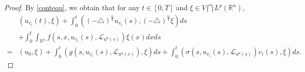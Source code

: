 \documentclass[11pt]{article}
\numberwithin{equation}{section}
\theoremstyle{plain}
\begin{document}
\begin{proof}
    By \eqref{contequ}, we obtain that for any
    $t\in [0,T]$ and
    $\xi \in  V \bigcap L^p(\mathbb{R}^n)$,
    \begin{align} \label{sc-12}
        & \left( u_{v_i} (t), \xi \right)
        + \int_0^t
        \left( (-\triangle)^{\frac{\alpha}{2}} u_{v_i}(s),
        (-\triangle)^{\frac{\alpha}{2}} \xi
        \right) ds
        \nonumber \\
        & + \int_0^t \int_{\mathbb{R}^n} f( s, x, u_{v_i}(s), \mathcal{L}_{u^0(s)} ) \xi(x) dx ds
        \nonumber\\
        = & \left(u_0, \xi\right)
        + \int_0^t \left( g(s, u_{v_i}(s), \mathcal{L}_{u^0(s)} ), \xi \right) ds
        + \int_0^t \left( \sigma(s, u_{v_i}(s), \mathcal{L}_{u^0(s)} ) v_i(s), \xi \right) ds.
    \end{align}



\end{proof}
\end{document}
